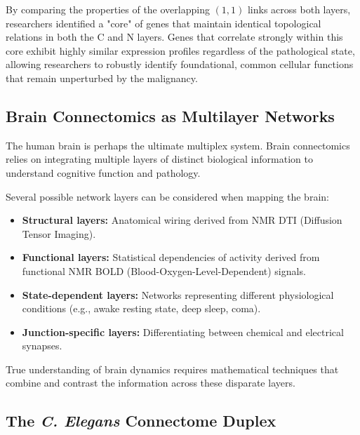 By comparing the properties of the overlapping \((1,1)\) links across both layers, researchers identified a "core" of genes that maintain identical topological relations in both the C and N layers. Genes that correlate strongly within this core exhibit highly similar expression profiles regardless of the pathological state, allowing researchers to robustly identify foundational, common cellular functions that remain unperturbed by the malignancy.

\subsection{Brain Connectomics as Multilayer Networks}
\label{subsec:brain_connectomics}

The human brain is perhaps the ultimate multiplex system. Brain connectomics relies on integrating multiple layers of distinct biological information to understand cognitive function and pathology.


Several possible network layers can be considered when mapping the brain:
\begin{itemize}
    \item \textbf{Structural layers:} Anatomical wiring derived from NMR DTI (Diffusion Tensor Imaging).
    \item \textbf{Functional layers:} Statistical dependencies of activity derived from functional NMR BOLD (Blood-Oxygen-Level-Dependent) signals.
    \item \textbf{State-dependent layers:} Networks representing different physiological conditions (e.g., awake resting state, deep sleep, coma).
    \item \textbf{Junction-specific layers:} Differentiating between chemical and electrical synapses.
\end{itemize}
True understanding of brain dynamics requires mathematical techniques that combine and contrast the information across these disparate layers.

\subsection{The \textit{C. Elegans} Connectome Duplex}
\label{subsec:celegans_connectome}

